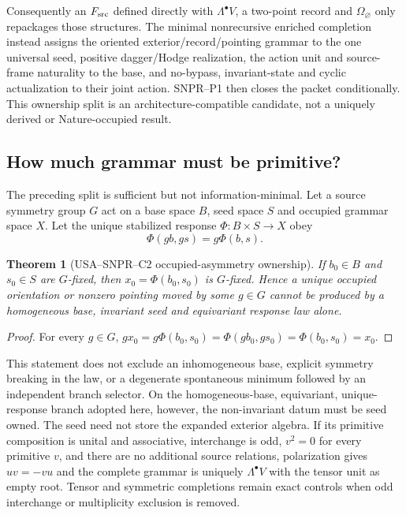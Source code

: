 \documentclass[11pt,a4paper]{article}
\newtheorem{theorem}[definition]{Theorem}
\theoremstyle{remark}
\begin{document}
Consequently an $F_{\rm src}$ defined directly with
$\Lambda^\bullet V$, a two-point record and $\Omega_\varnothing$ only
repackages those structures.  The minimal nonrecursive enriched completion
instead assigns the oriented exterior/record/pointing grammar to the one
universal seed, positive dagger/Hodge realization, the action unit and
source-frame naturality to the base, and no-bypass, invariant-state and cyclic
actualization to their joint action.  SNPR--P1 then closes the packet
conditionally.  This ownership split is an architecture-compatible candidate,
not a uniquely derived or Nature-occupied result.

\subsection{How much grammar must be primitive?}

The preceding split is sufficient but not information-minimal.  Let a source
symmetry group $G$ act on a base space $B$, seed space $S$ and occupied
grammar space $X$.  Let the unique stabilized response
$\Phi:B\times S\to X$ obey
\begin{equation}
 \Phi(gb,gs)=g\Phi(b,s).
 \label{eq:snprequivariance}
\end{equation}

\begin{theorem}[USA--SNPR--C2 occupied-asymmetry ownership]
If $b_0\in B$ and $s_0\in S$ are $G$-fixed, then
$x_0=\Phi(b_0,s_0)$ is $G$-fixed.  Hence a unique occupied orientation or
nonzero pointing moved by some $g\in G$ cannot be produced by a homogeneous
base, invariant seed and equivariant response law alone.
\label{thm:snprasymmetry}
\end{theorem}

\begin{proof}
For every $g\in G$,
$gx_0=g\Phi(b_0,s_0)=\Phi(gb_0,gs_0)=\Phi(b_0,s_0)=x_0$.
\end{proof}

This statement does not exclude an inhomogeneous base, explicit symmetry
breaking in the law, or a degenerate spontaneous minimum followed by an
independent branch selector.  On the homogeneous-base, equivariant,
unique-response branch adopted here, however, the non-invariant datum must be
seed owned.  The seed need not store the expanded exterior algebra.  If its
primitive composition is unital and associative, interchange is odd,
$v^2=0$ for every primitive $v$, and there are no additional source
relations, polarization gives $uv=-vu$ and the complete grammar is uniquely
$\Lambda^\bullet V$ with the tensor unit as empty root.  Tensor and symmetric
completions remain exact controls when odd interchange or multiplicity
exclusion is removed.
\end{document}
